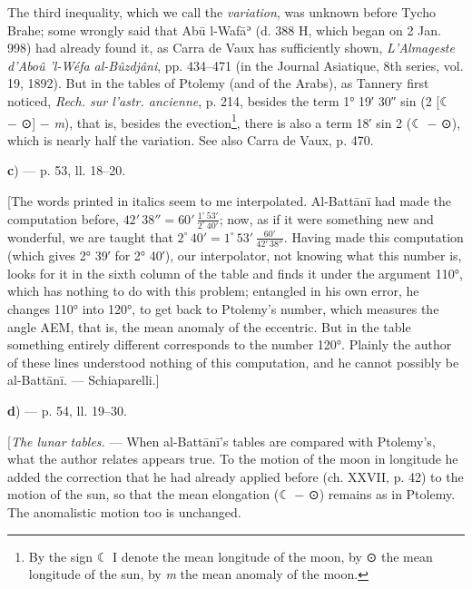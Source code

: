 \documentclass[11pt]{article}
\newcommand{\Pg}[1]{\marginpar{\footnotesize\color{gray}#1}}
\begin{document}
\par The third inequality, which we call the \emph{variation}, was unknown before Tycho Brahe; some wrongly said that Abū l-Wafāʾ (d. 388 H, which began on 2 Jan. 998) had already found it, as Carra de Vaux has sufficiently shown, \emph{L’Almageste d’Aboû ’l-Wéfa al-Bûzdjâni}, pp. 434–471 (in the Journal Asiatique, 8th series, vol. 19, 1892). But in the tables of Ptolemy (and of the Arabs), as Tannery first noticed, \emph{Rech. sur l’astr. ancienne}, p. 214, besides the term 1° 19′ 30″ sin (2 [{\MoonFont\upshape ☾} − {\MoonFont\upshape ⊙}] − \emph{m}), that is, besides the evection\footnote{By the sign {\MoonFont\upshape ☾} I denote the mean longitude of the moon, by {\MoonFont\upshape ⊙} the mean longitude of the sun, by \emph{m} the mean anomaly of the moon.}, there is also a term 18′ sin 2 ({\MoonFont\upshape ☾} − {\MoonFont\upshape ⊙}), which is nearly half the variation. See also Carra de Vaux, p. 470.\par
\par\begin{center}\textbf{c}) — p. 53, ll. 18–20.\end{center}
\par \Pg{I 225}[The words printed in italics seem to me interpolated. Al-Battānī had made the computation before, $42'\,38'' = 60'\,\frac{1^\circ\,53'}{2^\circ\,40'}$; now, as if it were something new and wonderful, we are taught that $2^\circ\,40' = 1^\circ\,53'\,\frac{60'}{42'\,38''}$. Having made this computation (which gives 2° 39′ for 2° 40′), our interpolator, not knowing what this number is, looks for it in the sixth column of the table and finds it under the argument 110°, which has nothing to do with this problem; entangled in his own error, he changes 110° into 120°, to get back to Ptolemy's number, which measures the angle AEM, that is, the mean anomaly of the eccentric. But in the table something entirely different corresponds to the number 120°. Plainly the author of these lines understood nothing of this computation, and he cannot possibly be al-Battānī. — Schiaparelli.]\par
\par\begin{center}\textbf{d}) — p. 54, ll. 19–30.\end{center}
\par [\emph{The lunar tables.} — When al-Battānī's tables are compared with Ptolemy's, what the author relates appears true. To the motion of the moon in longitude he added the correction that he had already applied before (ch. XXVII, p. 42) to the motion of the sun, so that the mean elongation ({\MoonFont\upshape ☾} − {\MoonFont\upshape ⊙}) remains as in Ptolemy. The anomalistic motion too is unchanged.\par
\end{document}
